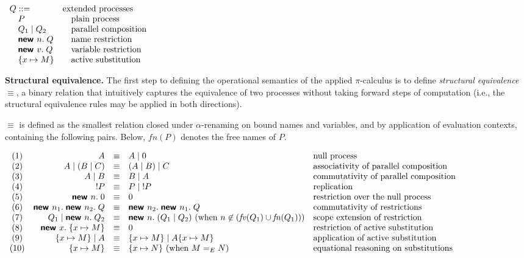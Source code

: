 \documentclass{article}
\theoremstyle{definition}
\begin{document}
$
\begin{array}{ll}
    Q ::=  & \text{extended processes} \\ 
    \quad P  & \quad\text{plain process} \\ 
    \quad Q_1 \mid Q_2 & \quad\text{parallel composition} \\ 
    \quad \textbf{\textsf{new }} n.\; Q & \quad\text{name restriction} \\ 
    \quad \textbf{\textsf{new }} v.\; Q & \quad\text{variable restriction} \\ 
    \quad \{ x \mapsto M\} & \quad\text{active substitution} 
\end{array}
$

\textbf{Structural equivalence.} The first step to defining the operational semantics of the applied $\pi$-calculus is to define \textit{structural equivalence} $\equiv$, a binary relation that intuitively captures the equivalence of two processes without taking forward steps of computation (i.e., the structural equivalence rules may be applied in both directions). 

$\equiv$ is defined as the smallest relation closed under $\alpha$-renaming on bound names and variables, and by application of evaluation contexts, containing the following pairs. Below, $\mathit{fn}(P)$ denotes the free names of $P$.

{\footnotesize
$
\begin{array}{crcll}
(1) & A & \equiv & A \mid 0 & \text{null process}\\
(2) & A \mid (B \mid C) & \equiv & (A \mid B) \mid C & \text{associativity of parallel composition}\\ 
(3) & A \mid B & \equiv & B \mid A  & \text{commutativity of parallel composition}\\ 
(4) & !P & \equiv & P \mid \;!P & \text{replication}\\ 
(5) & \textbf{\textsf{new }}n. \; 0 & \equiv & 0 & \text{restriction over the null process}\\
(6) & \textbf{\textsf{new }}n_1. \; \textbf{\textsf{new }}n_2. \;Q & \equiv & \textbf{\textsf{new }}n_2. \; \textbf{\textsf{new }}n_1. \;Q & \text{commutativity of restrictions}\\
(7) & Q_1 \mid \textbf{\textsf{new }}n.\; Q_2 & \equiv & \textbf{\textsf{new }}n.\;(Q_1 \mid Q_2) \text{ (when } n \not\in (\mathit{fv}(Q_1)\cup \mathit{fn}(Q_1)) \text{)} & \text{scope extension of restriction}\\ 
(8) & \textbf{\textsf{new }}x.\;\{x \mapsto M\} & \equiv & 0 & \text{restriction of active substitution}\\ 
(9) & \{x\mapsto M\} \mid A & \equiv & \{x\mapsto M\} \mid A\{x\mapsto M\} & \text{application of active substitution}\\ 
(10) & \{x\mapsto M\} & \equiv & \{x\mapsto N\} \text{ (when } M =_E N \text{)}& \text{equational reasoning on substitutions}
\end{array}
$}
\end{document}
